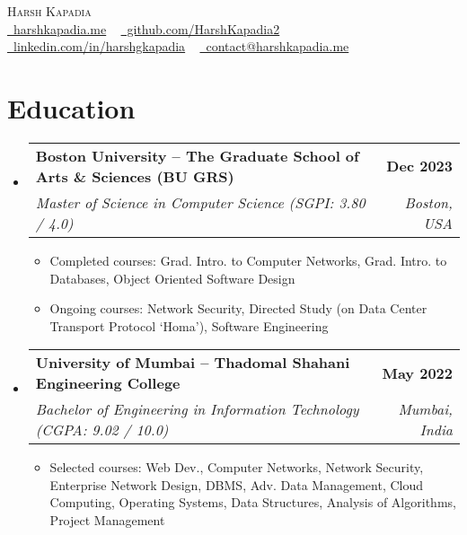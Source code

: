 \documentclass[letterpaper,11pt]{article}
\makeatletter
\newcommand{\resumeItem}[1]{
  \item\small{
    {#1 \vspace{-2pt}}
  }
}
\newcommand{\resumeSubheading}[4]{
  \vspace{-2pt}\item
    \begin{tabular*}{1.0\textwidth}[t]{l@{\extracolsep{\fill}}r}
      \vspace{-2pt}\textbf{#1} & \textbf{\small #2} \\
      \textit{\small#3} & \textit{\small #4} \\
    \end{tabular*}\vspace{-7pt}
}
\newcommand{\resumeSubHeadingListStart}{\begin{itemize}[leftmargin=0.0in, label={}]}
\newcommand{\resumeSubHeadingListEnd}{\end{itemize}}
\newcommand{\resumeItemListStart}{\begin{itemize}}
\newcommand{\resumeItemListEnd}{\end{itemize}\vspace{-5pt}}
\makeatother
\begin{document}

\begin{center}
    {\huge \scshape Harsh Kapadia} \\ \vspace{1pt}
    \small
    \faGlobe \href{https://harshkapadia.me}{\raisebox{-0.1\height}\ harshkapadia.me} ~
    \faGithub \href{https://github.com/HarshKapadia2}{\raisebox{-0.2\height}\ github.com/HarshKapadia2} ~
    \faLinkedin \href{https://linkedin.com/in/harshgkapadia}{\raisebox{-0.2\height}\ linkedin.com/in/harshgkapadia} ~
    \faEnvelope \href{mailto:contact@harshkapadia.me}{\raisebox{-0.2\height}\  contact@harshkapadia.me}
    \vspace{-13pt}
\end{center}


\section{Education}
    \vspace{-2pt}
    \resumeSubHeadingListStart
        \resumeSubheading
            {Boston University -- The Graduate School of Arts \& Sciences (BU GRS)}{Dec 2023}
            {Master of Science in Computer Science (SGPI: 3.80 / 4.0)}{Boston, USA}
            \resumeItemListStart
                \resumeItem{Completed courses: Grad. Intro. to Computer Networks, Grad. Intro. to Databases, Object Oriented Software Design}
                \resumeItem{Ongoing courses: Network Security, Directed Study (on Data Center Transport Protocol `Homa'), Software Engineering}
            \resumeItemListEnd
        \vspace{-3pt}

        \resumeSubheading
            {University of Mumbai -- Thadomal Shahani Engineering College}{May 2022}
            {Bachelor of Engineering in Information Technology (CGPA: 9.02 / 10.0)}{Mumbai, India}
            \resumeItemListStart
                \resumeItem{Selected courses: Web Dev., Computer Networks, Network Security, Enterprise Network Design, DBMS, Adv. Data Management, Cloud Computing, Operating Systems, Data Structures, Analysis of Algorithms, Project Management}
            \resumeItemListEnd
    \resumeSubHeadingListEnd
\vspace{-19pt}
\end{document}
